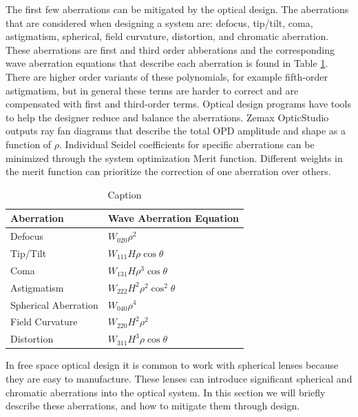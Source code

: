 The first few aberrations can be mitigated by the optical design. The aberrations that are considered when designing a system are: defocus, tip/tilt, coma, astigmatism, spherical, field curvature, distortion, and chromatic aberration. These aberrations are first and third order abberations and the corresponding wave aberration equations that describe each aberration is found in Table \ref{tab:aberrations}. There are higher order variants of these polynomials, for example fifth-order astigmatism, but in general these terms are harder to correct and are compensated with first and third-order terms. Optical design programs have tools to help the designer reduce and balance the aberrations. Zemax OpticStudio outputs ray fan diagrams that describe the total OPD amplitude and shape as a function of $\rho$. Individual Seidel coefficients for specific aberrations can be minimized through the system optimization Merit function. Different weights in the merit function can prioritize the correction of one aberration over others. 


\begin{table}
	\begin{center}
		\begin{tabular}{ | l| l | }
			\hline
			\textbf{Aberration}& \textbf{Wave Aberration Equation} \\ \hline
			Defocus & $W_{020}\rho^2$\\ \hline
			Tip/Tilt & $W_{111}H\rho \cos\theta$ \\ \hline
			Coma & $W_{131}H\rho^3\cos\theta$  \\ \hline
			Astigmatism & $W_{222}H^2\rho^2\cos^2\theta$  \\ \hline
			Spherical Aberration & $W_{040}\rho^4$ \\ \hline
			Field Curvature & $W_{220}H^2\rho^2$ \\ \hline
			Distortion & $W_{311}H^3 \rho \cos\theta$ \\ \hline
				
		\end{tabular}
	\end{center}
	\caption{Caption}
	\label{tab:aberrations}
\end{table}

In free space optical design it is common to work with spherical lenses because they are easy to manufacture. These lenses can introduce significant spherical and chromatic aberrations into the optical system. In this section we will briefly describe these aberrations, and how to mitigate them through design.  

